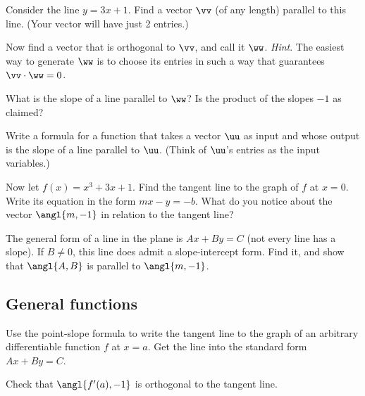 \documentclass[12pt]{exam}
\theoremstyle{definition}
\begin{document}
\begin{questions} 

\question Consider the line $y = 3x+1$. Find a vector $\vv$ (of any length) parallel to this line. (Your vector will have just 2 entries.)


\question Now find a vector that is orthogonal to $\vv$, and call it $\ww$. \emph{Hint}. The easiest way to generate $\ww$ is to choose its entries in such a way that guarantees $\vv \cdot \ww = 0$.


\question What is the slope of a line parallel to $\ww$? Is the product of the slopes $-1$ as claimed?

\newpage

\question Write a formula for a function that takes a vector $\uu$ as input and whose output is the slope of a line parallel to $\uu$. (Think of $\uu$'s entries as the input variables.)


\question Now let $f(x) = x^3 + 3x + 1$. Find the tangent line to the graph of $f$ at $x = 0$. Write its equation in the form $mx - y = -b$. What do you notice about the vector $\angl{m, -1}$ in relation to the tangent line?


\question The general form of a line in the plane is $Ax + By = C$ (not every line has a slope). If $B \ne 0$, this line does admit a slope-intercept form. Find it, and show that $\angl{A, B}$ is parallel to $\angl{m, -1}$.


\subsection{General functions}


\question Use the point-slope formula to write the tangent line to the graph of an arbitrary differentiable function $f$ at $x = a$. Get the line into the standard form $Ax + By = C$. 


\question Check that $\angl{f'(a), -1}$ is orthogonal to the tangent line.


\end{questions} 
\end{document}
